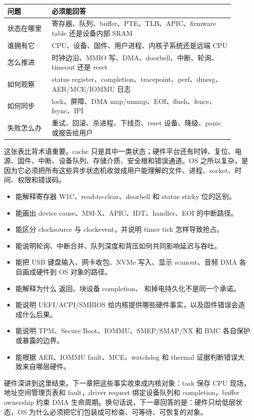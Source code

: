 \begin{longtable}{p{0.18\linewidth}p{0.74\linewidth}}
\toprule
问题 & 必须能回答 \\
\midrule
状态在哪里 & 寄存器、队列、buffer、PTE、TLB、APIC、firmware table 还是设备内部 SRAM \\
谁拥有它 & CPU、设备、固件、用户进程、内核子系统还是远端 CPU \\
怎么推进 & 时钟边沿、MMIO 写、DMA、doorbell、中断、轮询、timeout 还是 reset \\
如何观察 & status register、completion、tracepoint、perf、dmesg、AER/MCE/IOMMU 日志 \\
如何同步 & lock、屏障、DMA map/unmap、EOI、flush、fence、fsync、IPI \\
失败怎么办 & 重试、回滚、杀进程、下线页、reset 设备、降级、panic 或报告给用户 \\
\bottomrule
\end{longtable}

这张表比背术语重要。cache 只是其中一类状态；硬件平台还有时钟、复位、电源、固件、中断、设备队列、存储介质、安全根和错误通道。OS 之所以复杂，是因为它必须把所有这些异步状态机收敛成用户能理解的文件、进程、socket、时间、权限和错误码。

\begin{rubricbox}
\begin{itemize}
\tightlist
\item 能解释寄存器 W1C、read-to-clear、doorbell 和 status sticky 位的区别。
\item 能画出 device cause、MSI-X、APIC、IDT、handler、EOI 的中断路径。
\item 能区分 clocksource 与 clockevent，并说明 timer tick 怎样导致抢占。
\item 能说明轮询、中断合并、队列深度和背压如何共同影响延迟与吞吐。
\item 能把 USB 键盘输入、网卡收包、NVMe 写入、显示 scanout、音频 DMA 各自画成硬件到 OS 对象的路径。
\item 能解释为什么  返回、块设备 completion、 和掉电持久化不是同一个承诺。
\item 能说明 UEFI/ACPI/SMBIOS 给内核提供哪些硬件事实，以及固件错误会造成什么后果。
\item 能说明 TPM、Secure Boot、IOMMU、SMEP/SMAP/NX 和 BMC 各自保护或暴露的边界。
\item 能根据 AER、IOMMU fault、MCE、watchdog 和 thermal 证据判断错误大致来自哪层硬件。
\end{itemize}
\end{rubricbox}

硬件深讲到这里结束。下一章把这些事实收束成内核对象：task 保存 CPU 现场，地址空间管理页表和 fault，driver request 绑定设备队列和 completion，buffer ownership 约束 DMA 生命周期。换句话说，下一章回答的是：硬件只给低层状态，OS 为什么必须把它们包装成可检查、可等待、可恢复的对象。
